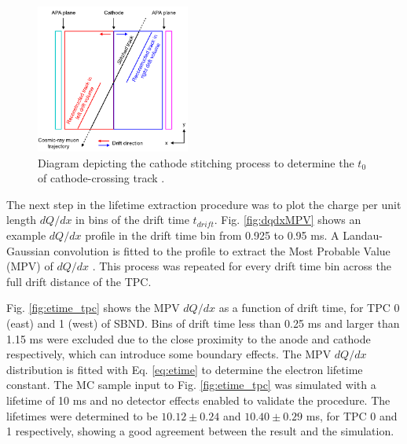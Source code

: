 \begin{figure}[h!] 
\centering    
\includegraphics[width=0.45\textwidth]{cosmic_stitch}
\caption[Cathode Stitch Diagram]{
Diagram depicting the cathode stitching process to determine the $t_{0}$ of cathode-crossing track \cite{pandora_protodune}.
}
\label{fig:cosmic_stitch}
\end{figure}


The next step in the lifetime extraction procedure was to plot the charge per unit length $dQ/dx$ in bins of the drift time $t_{drift}$.
Fig. \ref{fig:dqdxMPV} shows an example $dQ/dx$ profile in the drift time bin from 0.925 to 0.95 ms.
A Landau-Gaussian convolution is fitted to the profile to extract the Most Probable Value (MPV) of $dQ/dx$ \cite{Passage}.
This process was repeated for every drift time bin across the full drift distance of the TPC.

Fig. \ref{fig:etime_tpc} shows the MPV $dQ/dx$ as a function of drift time, for TPC 0 (east) and 1 (west) of SBND.
Bins of drift time less than 0.25 ms and larger than 1.15 ms were excluded due to the close proximity to the anode and cathode respectively, which can introduce some boundary effects.
The MPV $dQ/dx$ distribution is fitted with Eq. \ref{eq:etime} to determine the electron lifetime constant.
The MC sample input to Fig. \ref{fig:etime_tpc} was simulated with a lifetime of 10 ms and no detector effects enabled to validate the procedure.                                       
The lifetimes were determined to be $10.12\pm0.24$ and $10.40\pm0.29$ ms, for TPC 0 and 1 respectively, showing a good agreement between the result and the simulation. 


